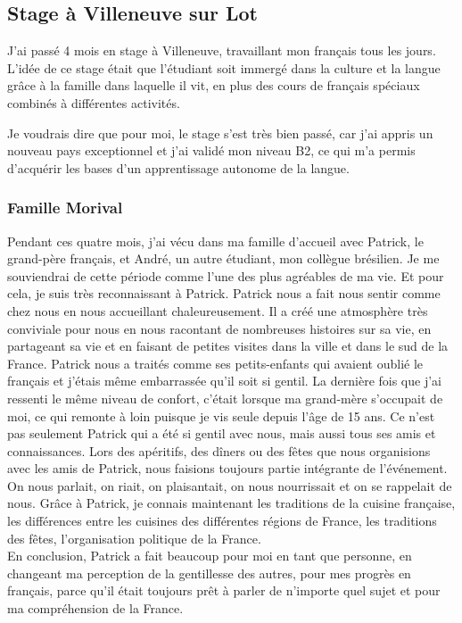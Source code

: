 \documentclass[a4paper,12pt]{article}
\begin{document}
\subsection{Stage à Villeneuve sur Lot}


J'ai passé 4 mois en stage à Villeneuve, travaillant mon français tous les jours. L'idée de ce stage était que l'étudiant soit immergé dans la culture et la langue grâce à la famille dans laquelle il vit, en plus des cours de français spéciaux combinés à différentes activités. 

Je voudrais dire que pour moi, le stage s'est très bien passé, car j'ai appris un nouveau pays exceptionnel et j'ai validé mon niveau B2, ce qui m'a permis d'acquérir les bases d'un apprentissage autonome de la langue. 


\subsubsection{Famille Morival}

Pendant ces quatre mois, j'ai vécu dans ma famille d'accueil avec Patrick, le grand-père français, et André, un autre étudiant, mon collègue brésilien. Je me souviendrai de cette période comme l'une des plus agréables de ma vie. Et pour cela, je suis très reconnaissant à Patrick. Patrick nous a fait nous sentir comme chez nous en nous accueillant chaleureusement. Il a créé une atmosphère très conviviale pour nous en nous racontant de nombreuses histoires sur sa vie, en partageant sa vie et en faisant de petites visites dans la ville et dans le sud de la France. Patrick nous a traités comme ses petits-enfants qui avaient oublié le français et j'étais même embarrassée qu'il soit si gentil. La dernière fois que j'ai ressenti le même niveau de confort, c'était lorsque ma grand-mère s'occupait de moi, ce qui remonte à loin puisque je vis seule depuis l'âge de 15 ans. 
Ce n'est pas seulement Patrick qui a été si gentil avec nous, mais aussi tous ses amis et connaissances. Lors des apéritifs, des dîners ou des fêtes que nous organisions avec les amis de Patrick, nous faisions toujours partie intégrante de l'événement. On nous parlait, on riait, on plaisantait, on nous nourrissait et on se rappelait de nous. 
Grâce à Patrick, je connais maintenant les traditions de la cuisine française, les différences entre les cuisines des différentes régions de France, les traditions des fêtes, l'organisation politique de la France.\\
En conclusion, Patrick a fait beaucoup pour moi en tant que personne, en changeant ma perception de la gentillesse des autres, pour mes progrès en français, parce qu'il était toujours prêt à parler de n'importe quel sujet et pour ma compréhension de la France. 
\end{document}
